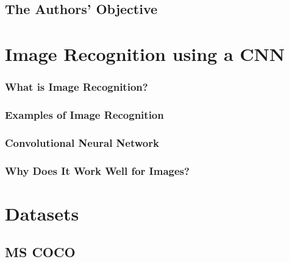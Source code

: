 \documentclass[xcolor=dvipsnames]{beamer}
\begin{document}
		\subsection{The Authors' Objective}
		
			\begin{frame}
				\frametitle{}
				
			\end{frame}
	
	\section{Image Recognition using a CNN}
		
		\begin{frame}
			\frametitle{What is Image Recognition?}
			
		\end{frame}
	
		\begin{frame}
			\frametitle{Examples of Image Recognition}
			
		\end{frame}
	
		\begin{frame}
			\frametitle{Convolutional Neural Network}
			
		\end{frame}
	
		\begin{frame}
			\frametitle{Why Does It Work Well for Images?}
			
		\end{frame}
	
	\section{Datasets}
		
		\begin{frame}
			\frametitle{}
			
		\end{frame}
	
		\subsection{MS COCO}
			
			\begin{frame}
				\frametitle{}
				
			\end{frame}
		
\end{document}
